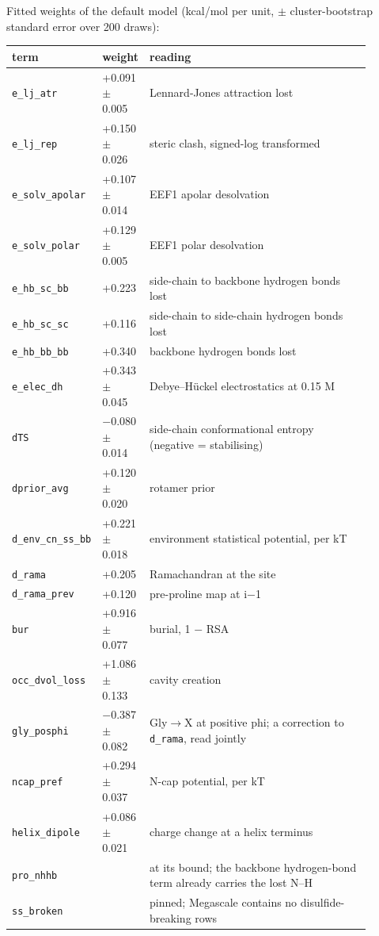 \documentclass[11pt,a4paper]{article}
\begin{document}
Fitted weights of the default model (kcal/mol per unit, $\pm$ cluster-bootstrap standard error over 200 draws):

\begin{center}\scriptsize
\begin{tabular}{@{}>{\raggedright\arraybackslash}p{0.138\linewidth}>{\raggedright\arraybackslash}p{0.121\linewidth}>{\raggedright\arraybackslash}p{0.640\linewidth}@{}}
\toprule
term & weight & reading \\
\midrule
\texttt{e\_lj\_atr} & +0.091 $\pm$ 0.005 & Lennard-Jones attraction lost \\
\texttt{e\_lj\_rep} & +0.150 $\pm$ 0.026 & steric clash, signed-log transformed \\
\texttt{e\_solv\_apolar} & +0.107 $\pm$ 0.014 & EEF1 apolar desolvation \\
\texttt{e\_solv\_polar} & +0.129 $\pm$ 0.005 & EEF1 polar desolvation \\
\texttt{e\_hb\_sc\_bb} & +0.223 & side-chain to backbone hydrogen bonds lost \\
\texttt{e\_hb\_sc\_sc} & +0.116 & side-chain to side-chain hydrogen bonds lost \\
\texttt{e\_hb\_bb\_bb} & +0.340 & backbone hydrogen bonds lost \\
\texttt{e\_elec\_dh} & +0.343 $\pm$ 0.045 & Debye--Hückel electrostatics at 0.15 M \\
\texttt{dTS} & $-$0.080 $\pm$ 0.014 & side-chain conformational entropy (negative = stabilising) \\
\texttt{dprior\_avg} & +0.120 $\pm$ 0.020 & rotamer prior \\
\texttt{d\_env\_cn\_ss\_bb} & +0.221 $\pm$ 0.018 & environment statistical potential, per kT \\
\texttt{d\_rama} & +0.205 & Ramachandran at the site \\
\texttt{d\_rama\_prev} & +0.120 & pre-proline map at i$-$1 \\
\texttt{bur} & +0.916 $\pm$ 0.077 & burial, 1 $-$ RSA \\
\texttt{occ\_dvol\_loss} & +1.086 $\pm$ 0.133 & cavity creation \\
\texttt{gly\_posphi} & $-$0.387 $\pm$ 0.082 & Gly$\rightarrow$X at positive phi; a correction to \texttt{d\_rama}, read jointly \\
\texttt{ncap\_pref} & +0.294 $\pm$ 0.037 & N-cap potential, per kT \\
\texttt{helix\_dipole} & +0.086 $\pm$ 0.021 & charge change at a helix terminus \\
\texttt{pro\_nhhb} & 0.000 & at its bound; the backbone hydrogen-bond term already carries the lost N--H \\
\texttt{ss\_broken} & 0.000 & pinned; Megascale contains no disulfide-breaking rows \\
\bottomrule
\end{tabular}\end{center}
\end{document}
